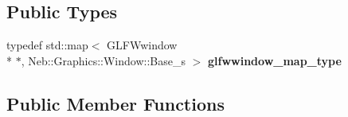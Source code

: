 \subsection*{Public Types}
\begin{DoxyCompactItemize}
\item 
\hypertarget{classNeb_1_1App_1_1Base_a893ad32232e1d5607f16c0a8712e2742}{typedef std\-::map$<$ G\-L\-F\-Wwindow \\*
$\ast$, Neb\-::\-Graphics\-::\-Window\-::\-Base\-\_\-s $>$ {\bfseries glfwwindow\-\_\-map\-\_\-type}}\label{classNeb_1_1App_1_1Base_a893ad32232e1d5607f16c0a8712e2742}

\end{DoxyCompactItemize}
\subsection*{Public Member Functions}
